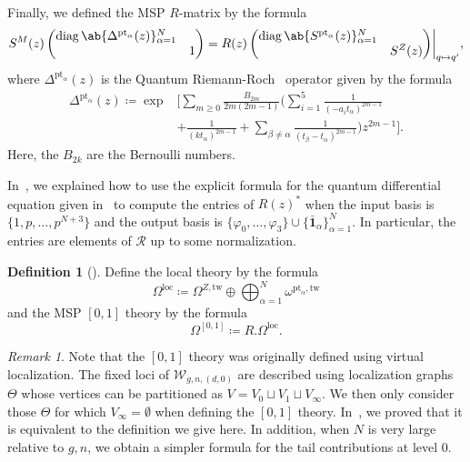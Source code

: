 \documentclass[10pt]{amsart}
\theoremstyle{definition}
\newtheorem{defn}[thm]{Definition}
\theoremstyle{remark}
\newtheorem{rmk}[thm]{Remark}
\theoremstyle{plain}
\theoremstyle{definition}
\theoremstyle{remark}
\newcommand{\mc}[1]{\mathcal{#1}}
\newcommand{\msc}[1]{\mathscr{#1}}
\newcommand{\mr}[1]{\mathrm{#1}}
\newcommand{\on}[1]{\operatorname{#1}}
\newcommand{\1}{\mathbf{1}}
\newcommand{\2}{\mathbf{2}}
\newcommand{\3}{\mathbf{3}}
\newcommand{\pt}{\mr{pt}}
\newcommand{\loc}{\mr{loc}}
\newcommand{\tw}{\mr{tw}}
\numberwithin{equation}{section}
\begin{document}
Finally, we defined the MSP $R$-matrix by the formula
\begin{equation}\label{eqn:rmatrix}
    S^M(z) \begin{pmatrix}
    \on{diag}\ab\{ \Delta^{\pt_{\alpha}}(z)\}_{\alpha=1}^N & \\
    & 1
\end{pmatrix} = R(z) \begin{pmatrix}
    \on{diag}\ab\{ S^{\pt_{\alpha}}(z)\}_{\alpha=1}^N & \\
    & S^{Z}(z)
\end{pmatrix}\biggr|_{q \mapsto q'},
\end{equation}
where $\Delta^{\pt_{\alpha}}(z)$ is the Quantum Riemann-Roch~\cite{qrr} operator given by the formula
\begin{align*}
    \Delta^{\pt_{\alpha}}(z) \coloneqq \exp &\Biggl[\sum_{m \geq 0} \frac{B_{2m}}{2m(2m-1)} \Biggl(\sum_{i=1}^5 \frac{1}{(-a_i t_{\alpha})^{2m-1}}  \\
    &+ \frac{1}{(kt_{\alpha})^{2m-1}} + \sum_{\beta \neq \alpha} \frac{1}{(t_{\beta} - t_{\alpha})^{2m-1}}\Biggr) z^{2m-1} \Biggr].
\end{align*}
Here, the $B_{2k}$ are the Bernoulli numbers.


In~\cite[\S 5]{polynomiality}, we explained how to use the explicit formula for the quantum differential equation given in~\cite[Lemma 2.18]{polynomiality} to compute the entries of $R(z)^*$ when the input basis is $\{1, p, \ldots, p^{N+3}\}$ and the output basis is $\{\varphi_0, \ldots, \varphi_3\} \cup \{\bar{\1}_{\alpha}\}_{\alpha=1}^N$. In particular, the entries are elements of $\msc{R}$ up to some normalization.

\begin{defn}[{\cite[Theorem 3.6]{polynomiality}}]
    Define the local theory by the formula
    \[ \Omega^{\loc} \coloneqq \Omega^{Z,\tw} \oplus \bigoplus_{\alpha=1}^N \omega^{\pt_{\alpha},\tw} \]
    and the MSP $[0,1]$ theory by the formula
    \[ \Omega^{[0,1]} \coloneqq R.\Omega^{\loc}. \]
\end{defn}

\begin{rmk}
    Note that the $[0,1]$ theory was originally defined using virtual localization. The fixed loci of $\mc{W}_{g,n,(d,0)}$ are described using localization graphs $\Theta$ whose vertices can be partitioned as $V = V_0 \sqcup V_1 \sqcup V_{\infty}$. We then only consider those $\Theta$ for which $V_{\infty} = \emptyset$ when defining the $[0,1]$ theory. In~\cite[\S 3]{polynomiality}, we proved that it is equivalent to the definition we give here. In addition, when $N$ is very large relative to $g,n$, we obtain a simpler formula for the tail contributions at level $0$.
\end{rmk}
\end{document}
